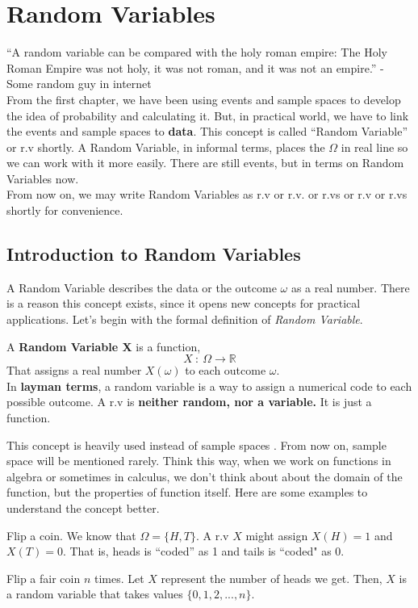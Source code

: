 \chapter{Random Variables}
``A random variable can be compared with the holy roman empire: The Holy Roman Empire was not holy, it was not roman, and it was not an
empire.'' - Some random guy in internet \\

From the first chapter, we have been using events and sample spaces to develop the idea of probability and calculating it. But, in
practical world,  we have to link the events and sample spaces to \textbf{data}. This concept is called ``Random Variable'' or r.v shortly.
A Random Variable, in informal terms, places the $\Omega$ in real line so we can work with it more easily. There are still events, but in
terms on Random Variables now.
\\From now on, we may write Random Variables as r.v or r.v. or r.vs or r.v or r.vs shortly for convenience.


\section{Introduction to Random Variables}

A Random Variable describes the data or the outcome $\omega$ as a real number. There is a reason this concept exists, since it opens new
concepts for practical applications.
\newline
Let's begin with the formal definition of \textit{ Random Variable}.

\begin{definition}
    A \textbf{Random Variable X} is a function,
    $$ X \ : \ \Omega \rightarrow \mathbb{R}$$
    That assigns a real number $X(\omega)$ to each outcome $\omega$. \\
    In \textbf{layman terms}, a random variable is a way to assign a numerical code to each possible outcome. A r.v is \textbf{neither
    random, nor a variable.} It is just a function.
\end{definition}

This concept is heavily used instead of sample spaces . From now on, sample space will be mentioned rarely. Think this way, when we work on
functions in algebra or sometimes in calculus, we don't think about about the domain of the function, but the properties of function itself.
Here are some examples to understand the concept better.
\begin{example} Flip a coin. We know that $\Omega =\{H,T\}$. A r.v $X$ might assign $X(H) = 1$ and $X(T) = 0$. That is, heads is ``coded''
    as 1 and tails is ``coded" as 0.

\end{example}
\begin{example}
    Flip a fair coin $n$ times. Let $X$ represent the number of heads we get. Then, $X$ is a random variable that takes values $\{0,1,2,...,n\}$.
\end{example}

